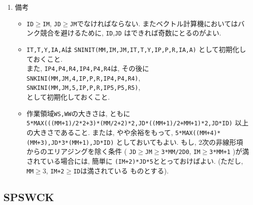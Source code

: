 \documentclass[a4j,fleqn]{jarticle}
\begin{document}
\begin{enumerate}
\item 備考

\begin{itemize}

\item {\tt ID}$\ge${\tt IM}, {\tt JD}$\ge${\tt JM}でなければならない.
   またベクトル計算機においてはバンク競合を避けるために, {\tt ID},{\tt JD}
   はできれば奇数にとるのがよい.

\item {\tt IT,T,Y,IA,A}は 
      {\tt SNINIT(MM,IM,JM,IT,T,Y,IP,P,R,IA,A)} として初期化しておくこと.\\
       また, {\tt IP4,P4,R4,IP4,P4,R4}は, その後に\\
      {\tt SNKINI(MM,JM,4,IP,P,R,IP4,P4,R4)},
      {\tt SNKINI(MM,JM,5,IP,P,R,IP5,P5,R5)}, \\
      として初期化しておくこと.

\item 作業領域{\tt WS,WW}の大きさは, ともに\\
     {\tt 5*MAX(((MM+1)/2*2+3)*(MM/2+2)*2,JD*((MM+1)/2+MM+1)*2,JD*ID)}
    以上の大きさであること. または, やや余裕をもって,
     {\tt 5*MAX((MM+4)*(MM+3),JD*3*(MM+1),JD*ID)}
    としておいてもよい. もし, 2次の非線形項からのエリアジングを除く条件
     ( {\tt JD}$\ge${\tt JM}$\ge${\tt 3*MM/2D0}, 
      {\tt IM}$\ge${\tt 3*MM+1} )が満されている場合には, 簡単に
      {\tt (IM+2)*JD*5}ととっておけばよい.
     (ただし, {\tt MM}$\ge 3$, {\tt IM+2}$\ge${\tt ID}は満されている
    ものとする).

 \end{itemize}

\end{enumerate}


\subsection{SPSWCK}
\end{document}
